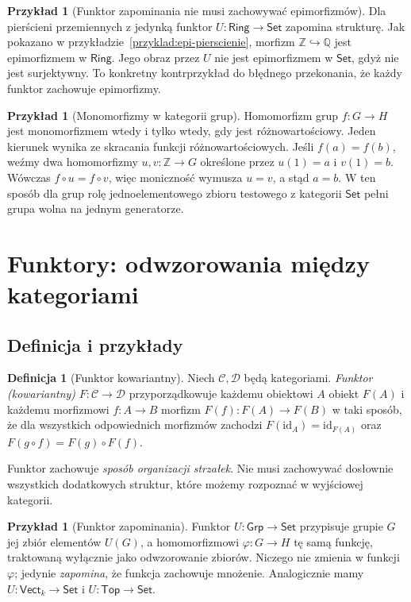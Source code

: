 \documentclass[11pt,a4paper]{article}
\numberwithin{equation}{section}
\theoremstyle{plain}
\theoremstyle{definition}
\newtheorem{definicja}[twierdzenie]{Definicja}
\newtheorem{przyklad}[twierdzenie]{Przykład}
\theoremstyle{remark}
\newcommand{\cat}[1]{\mathsf{#1}}
\newcommand{\Set}{\cat{Set}}
\newcommand{\Grp}{\cat{Grp}}
\newcommand{\Ring}{\cat{Ring}}
\newcommand{\Top}{\cat{Top}}
\newcommand{\Vect}{\cat{Vect}}
\newcommand{\id}{\mathrm{id}}
\begin{document}
\begin{przyklad}[Funktor zapominania nie musi zachowywać epimorfizmów]
Dla pierścieni przemiennych z jedynką funktor $U:\Ring\to\Set$ zapomina strukturę. Jak pokazano w przykładzie~\ref{przyklad:epi-pierscienie}, morfizm $\mathbb Z\hookrightarrow\mathbb Q$ jest epimorfizmem w $\Ring$. Jego obraz przez $U$ nie jest epimorfizmem w $\Set$, gdyż nie jest surjektywny. To konkretny kontrprzykład do błędnego przekonania, że każdy funktor zachowuje epimorfizmy.
\end{przyklad}

\begin{przyklad}[Monomorfizmy w kategorii grup]
Homomorfizm grup $f:G\to H$ jest monomorfizmem wtedy i tylko wtedy, gdy jest różnowartościowy. Jeden kierunek wynika ze skracania funkcji różnowartościowych. Jeśli $f(a)=f(b)$, weźmy dwa homomorfizmy $u,v:\mathbb Z\to G$ określone przez $u(1)=a$ i $v(1)=b$. Wówczas $f\circ u=f\circ v$, więc moniczność wymusza $u=v$, a stąd $a=b$. W ten sposób dla grup rolę jednoelementowego zbioru testowego z kategorii $\Set$ pełni grupa wolna na jednym generatorze.
\end{przyklad}


\section{Funktory: odwzorowania między kategoriami}\label{sec:funktory}

\subsection{Definicja i przykłady}

\begin{definicja}[Funktor kowariantny]\label{def:funktor}
Niech $\mathcal C,\mathcal D$ będą kategoriami. \emph{Funktor (kowariantny)} $F:\mathcal C\to\mathcal D$ przyporządkowuje każdemu obiektowi $A$ obiekt $F(A)$ i każdemu morfizmowi $f:A\to B$ morfizm $F(f):F(A)\to F(B)$ w taki sposób, że dla wszystkich odpowiednich morfizmów zachodzi $F(\id_A)=\id_{F(A)}$ oraz $F(g\circ f)=F(g)\circ F(f)$.
\end{definicja}

Funktor zachowuje \emph{sposób organizacji strzałek}. Nie musi zachowywać dosłownie wszystkich dodatkowych struktur, które możemy rozpoznać w wyjściowej kategorii.

\begin{przyklad}[Funktor zapominania]
Funktor $U:\Grp\to\Set$ przypisuje grupie $G$ jej zbiór elementów $U(G)$, a homomorfizmowi $\varphi:G\to H$ tę samą funkcję, traktowaną wyłącznie jako odwzorowanie zbiorów. Niczego nie zmienia w funkcji $\varphi$; jedynie \emph{zapomina}, że funkcja zachowuje mnożenie. Analogicznie mamy $U:\Vect_k\to\Set$ i $U:\Top\to\Set$.
\end{przyklad}
\end{document}

